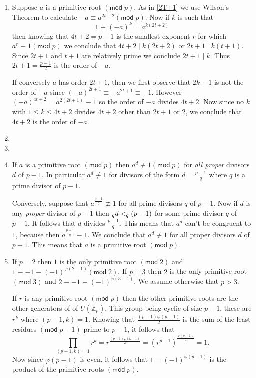 \documentclass[12pt]{article}
\renewcommand{\pmod}[1]{\left(\mathsf{mod}\;#1\right)}
\let\ord\relax\DeclareMathOperator{\ord}{\mathsf{ord}}
\begin{document}
\begin{enumerate}
\item %
Suppose $a$ is a primitive root $\pmod{p}$. As in \autoref{2T+1}
we use Wilson's Theorem to calculate $-a\equiv a^{2t+2}\pmod{p}$.
Now if $k$ is such that
\[1\equiv\left(-a\right)^k=a^{k\left(2t+2\right)}\]
then knowing that $4t+2=p-1$ is the smallest exponent $r$ for
which $a^r\equiv 1\pmod{p}$ we conclude that
$4t+2\mid k\left(2t+2\right)$ or $2t+1\mid k\left(t+1\right)$.
Since $2t+1$ and $t+1$ are relatively prime we conclude $2t+1\mid k$.
Thus $2t+1=\frac{p-1}{2}$ is the order of $-a$.

If conversely $a$ has order $2t+1$, then we first observe that
$2k+1$ is not the order of $-a$ since $\left(-a\right)^{2t+1}
\equiv -a^{2t+1}\equiv -1$.
However $\left(-a\right)^{4t+2}=a^{2\left(2t+1\right)}\equiv 1$
so the order of $-a$ divides $4t+2$. Now since no
$k$ with $1\le k\le 4t+2$ divides $4t+2$ other than $2t+1$ or $2$,
we conclude that $4t+2$ is the order of $-a$.

\item %
\item %

\item %
If $a$ is a primitive root $\pmod{p}$ then $a^d\not\equiv 1\pmod{p}$
for {\em all proper} divisors $d$ of $p-1$. In particular $a^d\not\equiv 1$
for divisors of the form $d=\frac{p-1}{q}$ where $q$ is a prime divisor
of $p-1$.

Conversely, suppose that $a^{\frac{p-1}{q}}\not\equiv 1$
for all prime divisors
$q$ of $p-1$. Now if $d$ is any {\em proper} divisor of $p-1$ then
$\ord_q{d}<\ord_q\left(p-1\right)$ for some prime divisor $q$ of $p-1$.
It follows that $d$ divides $\frac{p-1}{q}$. This means that $a^d$ can't be
congruent to $1$, because then $a^{\frac{p-1}{q}}\equiv 1$.
We conclude that $a^d\not\equiv 1$ for all proper divisors $d$ of
$p-1$. This means that $a$ is a primitive root $\pmod{p}$.

\item %
If $p=2$ then $1$ is the only primitive root $\pmod{2}$
and $1\equiv -1\equiv\left(-1\right)^{\varphi\left(2-1\right)}
\pmod{2}$.
If $p=3$ then $2$ is the only primitive root $\pmod{3}$
and $2\equiv -1\equiv\left(-1\right)^{\varphi\left(3-1\right)}$.
We assume otherwise that $p>3$.

If $r$ is any primitive root $\pmod{p}$ then the other
primitive roots are the other generators of 
of $U\left(\mathbb{Z}_p\right)$.
This group being cyclic of size $p-1$,
these are $r^k$ where $\left(p-1,k\right)=1$.
Knowing that $\frac{\left(p-1\right)\varphi\left(p-1\right)}{2}$
is the sum of the least residues $\pmod{p-1}$
prime to $p-1$, it follows that
\[\prod_{\left(p-1,k\right)=1}r^k
=r^{\frac{\left(p-1\right)\varphi\left(k-1\right)}{2}}
=\left(r^{p-1}\right)^{\frac{\varphi\left(p-1\right)}{2}}=1.\]
Now since $\varphi\left(p-1\right)$ is even, it follows that
$1=\left(-1\right)^{\varphi\left(p-1\right)}$ is the product
of the primitive roots $\pmod{p}$.
\end{enumerate}
\end{document}
